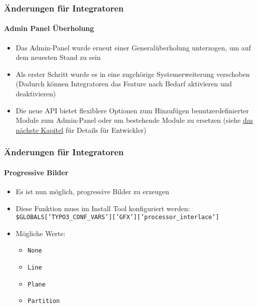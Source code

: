 \begin{frame}[fragile]
	\frametitle{Änderungen für Integratoren}
	\framesubtitle{Admin Panel Überholung}

	\hypersetup{colorlinks,citecolor=blue,linkcolor=blue,menucolor=blue,filecolor=blue,anchorcolor=blue}

	\begin{itemize}

		\item Das Admin-Panel wurde erneut einer Generalüberholung unterzogen, um auf dem neuesten Stand zu sein
		\item Als erster Schritt wurde es in eine zugehörige Systemerweiterung verschoben\newline
			\smaller
				(Dadurch können Integratoren das Feature nach Bedarf aktivieren und deaktivieren)
			\normalsize

		\item Die neue API bietet flexiblere Optionen zum Hinzufügen benutzerdefinierter Module zum Admin-Panel
			oder um bestehende Module zu ersetzen\newline
			\smaller
				(siehe \hyperlink{AdminPanelCustomization}{das nächste Kapitel} für Details für Entwickler)
			\normalsize

	\end{itemize}

\end{frame}


\begin{frame}[fragile]
	\frametitle{Änderungen für Integratoren}
	\framesubtitle{Progressive Bilder}

	\begin{itemize}
		\item Es ist nun möglich, progressive Bilder zu erzeugen

		\item Diese Funktion muss im Install Tool konfiguriert werden:\newline
			\small
				\texttt{\$GLOBALS['TYPO3\_CONF\_VARS']['GFX']['processor\_interlace']}
			\normalsize

		\item Mögliche Werte:
			\begin{itemize}
				\item \texttt{None}
				\item \texttt{Line}
				\item \texttt{Plane}
				\item \texttt{Partition}
			\end{itemize}

	\end{itemize}

\end{frame}

